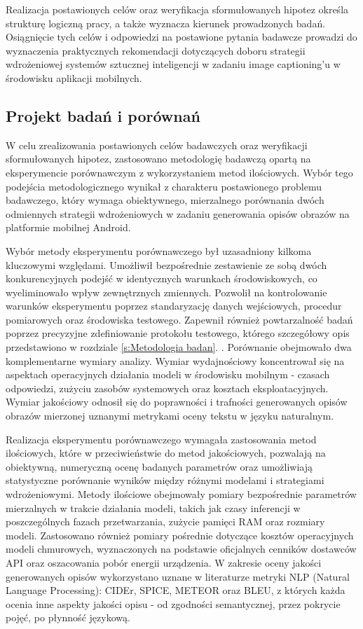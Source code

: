 \noindent
Realizacja postawionych celów oraz weryfikacja sformułowanych hipotez określa strukturę logiczną pracy,
a także wyznacza kierunek prowadzonych badań. Osiągnięcie tych celów i odpowiedzi na postawione pytania badawcze
prowadzi do wyznaczenia praktycznych rekomendacji dotyczących doboru strategii wdrożeniowej systemów sztucznej inteligencji
w zadaniu image captioning'u w środowisku aplikacji mobilnych.


\subsection{Projekt badań i porównań}\label{ss:Metodologia badawcza}

\noindent
W celu zrealizowania postawionych celów badawczych oraz weryfikacji sformułowanych hipotez, 
zastosowano metodologię badawczą opartą na eksperymencie porównawczym z wykorzystaniem metod ilościowych. 
Wybór tego podejścia metodologicznego wynikał z charakteru postawionego problemu badawczego, 
który wymaga obiektywnego, mierzalnego porównania dwóch odmiennych strategii wdrożeniowych 
w zadaniu generowania opisów obrazów na platformie mobilnej Android.

Wybór metody eksperymentu porównawczego był uzasadniony kilkoma kluczowymi względami. Umożliwił 
bezpośrednie zestawienie ze sobą dwóch konkurencyjnych podejść w identycznych warunkach środowiskowych, 
co wyeliminowało wpływ zewnętrznych zmiennych. Pozwolił na kontrolowanie warunków eksperymentu poprzez 
standaryzację danych wejściowych, procedur pomiarowych oraz środowiska testowego. Zapewnił również 
powtarzalność badań poprzez precyzyjne zdefiniowanie protokołu testowego, którego szczegółowy 
opis przedstawiono w rozdziale \ref{s:Metodologia badan}. .
Porównanie obejmowało dwa komplementarne wymiary analizy. Wymiar wydajnościowy koncentrował 
się na aspektach operacyjnych działania modeli w środowisku mobilnym - czasach odpowiedzi, zużyciu 
zasobów systemowych oraz kosztach eksploatacyjnych. Wymiar jakościowy odnosił się do 
poprawności i trafności generowanych opisów obrazów mierzonej uznanymi metrykami oceny tekstu 
w języku naturalnym.

Realizacja eksperymentu porównawczego wymagała zastosowania metod ilościowych, które w przeciwieństwie 
do metod jakościowych, pozwalają na obiektywną, numeryczną ocenę badanych parametrów oraz umożliwiają 
statystyczne porównanie wyników między różnymi modelami i strategiami wdrożeniowymi. Metody ilościowe 
obejmowały pomiary bezpośrednie parametrów mierzalnych w trakcie działania modeli, takich jak 
czasy inferencji w poszczególnych fazach przetwarzania, zużycie pamięci RAM oraz 
rozmiary modeli. Zastosowano również pomiary pośrednie dotyczące kosztów operacyjnych modeli chmurowych, 
wyznaczonych na podstawie oficjalnych cenników dostawców API oraz oszacowania pobór energii urządzenia. W zakresie oceny jakości generowanych 
opisów wykorzystano uznane w literaturze metryki NLP (Natural Language Processing): CIDEr, SPICE, METEOR oraz BLEU, z których 
każda ocenia inne aspekty jakości opisu - od zgodności semantycznej, przez pokrycie pojęć, 
po płynność językową.


